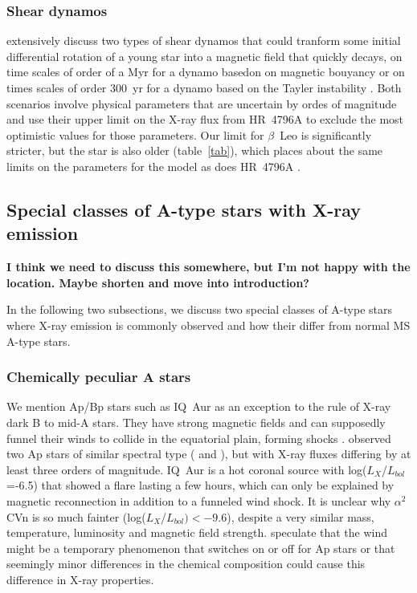 \documentclass[preprint2]{aastex631}
\begin{document}
\subsubsection{Shear dynamos}
\citet{2014ApJ...786..136D} extensively discuss two types of shear
dynamos that could tranform some initial differential rotation of a
young star into a magnetic field that quickly decays, on time scales
of order of a Myr for a dynamo basedon on magnetic bouyancy
\citep{1995MNRAS.272..528T} or on times scales of order 300~yr for a
dynamo based on the Tayler instability
\citep{2002A&A...381..923S,2006A&A...449..451B}. Both scenarios
involve physical parameters that are uncertain by ordes of magnitude
and \citet{2014ApJ...786..136D} use their upper limit on the X-ray
flux from HR~4796A to exclude the most optimistic values for those
parameters. Our limit for $\beta$~Leo is significantly stricter, but
the star is also older (table~\ref{tab}), which places about the same
limits on the parameters for the \citet{1995MNRAS.272..528T} model as
does HR~4796A \citep[See Fig 3 in][]{2014ApJ...786..136D}.


\subsection{Special classes of A-type stars with X-ray emission}
\textbf{I think we need to discuss this somewhere, but I'm not happy with the location. Maybe shorten and move into introduction?}

In the following two subsections, we discuss two special classes of A-type stars where X-ray emission is commonly observed and how their differ from normal MS A-type stars.
\subsubsection{Chemically peculiar A stars}


We mention Ap/Bp stars such as IQ~Aur as an exception to the rule of
X-ray dark B to mid-A stars.  They have strong magnetic fields and can
supposedly funnel their winds to collide in the equatorial plain,
forming shocks \citep{1997A&A...323..121B}.
\citet{2011A&A...531A..58R} observed two Ap stars of similar spectral
type ( and ), but with X-ray
fluxes differing by at least three orders of magnitude. IQ~Aur is a
hot coronal source with log($L_X$/$L_{bol}$=-6.5) that showed a
flare lasting a few hours, which can only be explained by magnetic
reconnection in addition to a funneled wind shock. It is unclear why
$\alpha^2$ CVn is so much fainter (log($L_X$/$L_{bol})<-9.6$),
despite a very similar mass, temperature, luminosity and magnetic
field strength. \citet{2011A&A...531A..58R} speculate that the wind
might be a temporary phenomenon that switches on or off for Ap stars
or that seemingly minor differences in the chemical composition
could cause this difference in X-ray properties.
\end{document}
